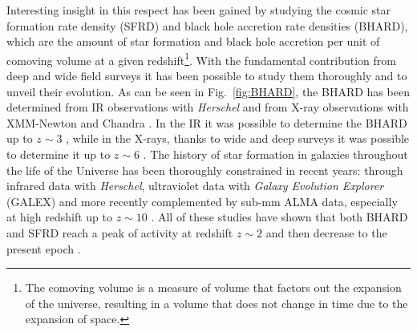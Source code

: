 
Interesting insight in this respect has been gained by studying the cosmic star formation rate density (SFRD) and black hole accretion rate densities (BHARD), which are the amount of star formation and black hole accretion per unit of comoving volume at a given redshift\footnote{The comoving volume is a measure of volume that factors out the expansion of the universe, resulting in a volume that does not change in time due to the expansion of space.}. With the fundamental contribution from deep and wide field surveys it has been possible to study them thoroughly and to unveil their evolution.
As can be seen in Fig.~\ref{fig:BHARD}, the BHARD has been determined from IR observations with \emph{Herschel} \citep{2010A&A...518L...1P} and from X-ray observations with XMM-Newton \citep{2001A&A...365L...1J} and Chandra \citep{2000SPIE.4012....2W}. In the IR it was possible to determine the BHARD up to $z\sim3$ \citep{2014MNRAS.439.2736D}, while in the X-rays, thanks to wide and deep surveys it was possible to determine it up to $z\sim 6$ \citep{2018MNRAS.473.2378V}.
The history of star formation in galaxies throughout the life of the Universe has been thoroughly constrained in recent years: %
through infrared data with \emph{Herschel}, ultraviolet data with \emph{Galaxy Evolution Explorer} (GALEX) \citep[see][for a review]{2014ARA&A..52..415M} and more recently complemented by sub-mm ALMA data, especially at high redshift up to $z\sim10$ \citep{2020ApJ...902..112B,2020A&A...643A...8G}. %
All of these studies have shown that both BHARD and SFRD reach a peak of activity at redshift $z\sim2$ and then decrease to the present epoch \citep{1998MNRAS.293L..49B}.

